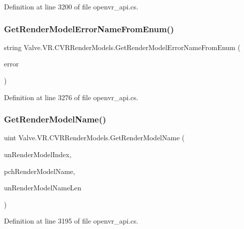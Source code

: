 Definition at line 3200 of file openvr\+\_\+api.\+cs.

\mbox{\label{class_valve_1_1_v_r_1_1_c_v_r_render_models_aa930abc30e6fdb3f7dbc438cda44b6b1}} 
\subsubsection{\texorpdfstring{GetRenderModelErrorNameFromEnum()}{GetRenderModelErrorNameFromEnum()}}
{\footnotesize\ttfamily string Valve.\+V\+R.\+C\+V\+R\+Render\+Models.\+Get\+Render\+Model\+Error\+Name\+From\+Enum (\begin{DoxyParamCaption}\item[{\mbox{\hyperlink{namespace_valve_1_1_v_r_ac95dda09bbb588fd83a8ac0ba3c82266}{E\+V\+R\+Render\+Model\+Error}}}]{error }\end{DoxyParamCaption})}



Definition at line 3276 of file openvr\+\_\+api.\+cs.

\mbox{\label{class_valve_1_1_v_r_1_1_c_v_r_render_models_aa45f9059f410da9f6946d41dad29561c}} 
\subsubsection{\texorpdfstring{GetRenderModelName()}{GetRenderModelName()}}
{\footnotesize\ttfamily uint Valve.\+V\+R.\+C\+V\+R\+Render\+Models.\+Get\+Render\+Model\+Name (\begin{DoxyParamCaption}\item[{uint}]{un\+Render\+Model\+Index,  }\item[{System.\+Text.\+String\+Builder}]{pch\+Render\+Model\+Name,  }\item[{uint}]{un\+Render\+Model\+Name\+Len }\end{DoxyParamCaption})}



Definition at line 3195 of file openvr\+\_\+api.\+cs.

